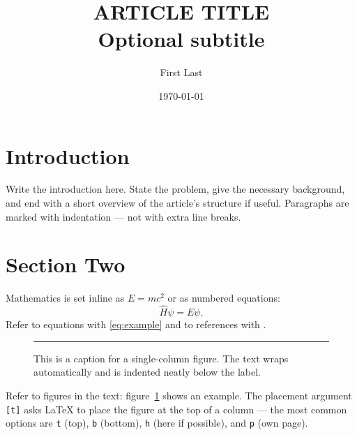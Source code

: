 \documentclass[a4paper,10pt,twocolumn]{article}
\title{ARTICLE TITLE\\[0.4em]
{\large Optional subtitle}}
\author{First Last}
\date{\today}
\begin{document}

\section{Introduction}

Write the introduction here. State the problem, give the necessary
background, and end with a short overview of the article's structure
if useful. Paragraphs are marked with indentation --- not with extra
line breaks.

\section{Section Two}

Mathematics is set inline as $E = mc^2$ or as numbered equations:
\begin{equation}
  \hat{H}\psi = E\psi.
  \label{eq:example}
\end{equation}
Refer to equations with \eqref{eq:example} and to references with
\cite{example2024}.

\begin{figure}[t]
  \centering
  \rule{0.9\linewidth}{3cm}     %
  \caption{This is a caption for a single-column figure.
           The text wraps automatically and is indented neatly
           below the label.}
  \label{fig:simple}
\end{figure}

Refer to figures in the text: figure~\ref{fig:simple} shows an
example. The placement argument \texttt{[t]} asks LaTeX to place
the figure at the top of a column --- the most common options are
\texttt{t} (top), \texttt{b} (bottom), \texttt{h} (here if possible),
and \texttt{p} (own page).
\end{document}

